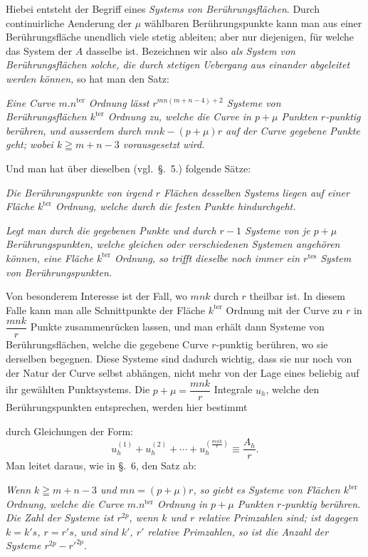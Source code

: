 \documentclass{article}
\begin{document}
Hiebei entsteht der Begriff eines \emph{Systems von Berührungsflächen}. Durch continuirliche Aenderung der $\mu$ wählbaren Berührungspunkte kann man aus einer Berührungsfläche unendlich viele stetig ableiten; aber nur diejenigen, für welche das System der $A$ dasselbe ist. Bezeichnen wir also \emph{als System von Berührungsflächen solche, die durch stetigen Uebergang aus einander abgeleitet werden können,} so hat man den Satz:

\emph{Eine Curve $m.n^{\text{ter}}$ Ordnung lässt $r^{mn(m+n-4)+2}$ Systeme von Berührungsflächen $k^{\text{ter}}$ Ordnung zu, welche die Curve in $p+\mu$ Punkten $r$-punktig berühren, und ausserdem durch $mnk-(p+\mu)r$ auf der Curve gegebene Punkte geht; wobei $k\geqq m+n-3$ vorausgesetzt wird.}

Und man hat über dieselben (vgl.\ §.~5.) folgende Sätze:

\emph{Die Berührungspunkte von irgend $r$ Flächen desselben Systems liegen auf einer Fläche $k^{\text{ter}}$ Ordnung, welche durch die festen Punkte hindurchgeht.}

\emph{Legt man durch die gegebenen Punkte und durch $r-1$ Systeme von je $p+\mu$ Berührungspunkten, welche gleichen oder verschiedenen Systemen angehören können, eine Fläche $k^{\text{ter}}$ Ordnung, so trifft dieselbe noch immer ein $r^{\text{tes}}$ System von Berührungspunkten.}

Von besonderem Interesse ist der Fall, wo $mnk$ durch $r$ theilbar ist. In diesem Falle kann man alle Schnittpunkte der Fläche $k^{\text{ter}}$ Ordnung mit der Curve zu $r$ in $\dfrac{mnk}{r}$ Punkte zusammenrücken lassen, und man erhält dann Systeme von Berührungsflächen, welche die gegebene Curve $r$-punktig berühren, wo sie derselben begegnen. Diese Systeme sind dadurch wichtig, dass sie nur noch von der Natur der Curve selbst abhängen, nicht mehr von der Lage eines beliebig auf ihr gewählten Punktsystems. Die $p+\mu = \dfrac{mnk}{r}$ Integrale $u_{h}$, welche den Berührungspunkten entsprechen, werden hier bestimmt

durch Gleichungen der Form:
\[
u_{h}^{(1)}+u_{h}^{(2)}+\cdots+u_{h}^{\left(\frac{mnk}{r}\right)} \equiv \frac{A_{h}}{r}.
\]
Man leitet daraus, wie in §.~6, den Satz ab:

\emph{Wenn $k\geqq m+n-3$ und $mn = (p+\mu)r$, so giebt es Systeme von Flächen $k^{\text{ter}}$ Ordnung, welche die Curve $m.n^{\text{ter}}$ Ordnung in $p+\mu$ Punkten $r$-punktig berühren. Die Zahl der Systeme ist $r^{2p}$, wenn $k$ und $r$ relative Primzahlen sind; ist dagegen $k=k's$, $r=r's$, und sind $k'$, $r'$ relative Primzahlen, so ist die Anzahl der Systeme $r^{2p}-r'^{2p}$.}
\end{document}
